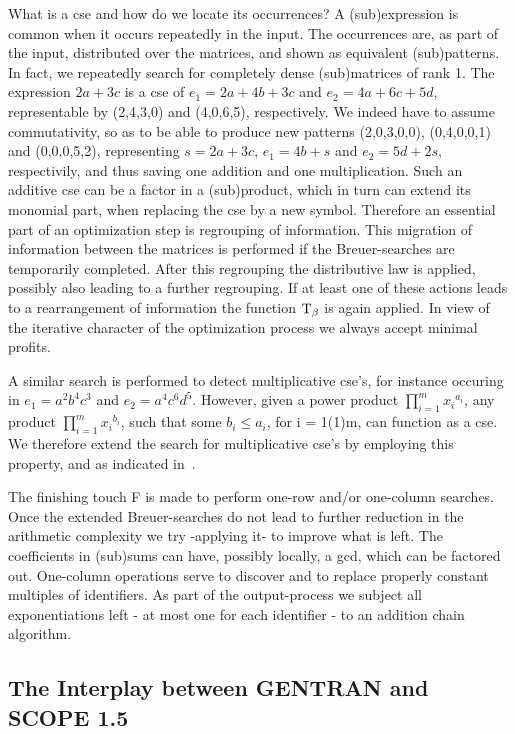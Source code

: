 What is a cse and how do we locate its occurrences?  A (sub)expression
is common when it occurs repeatedly in the input. The occurrences are,
as part of the input, distributed over the matrices, and shown as
equivalent (sub)patterns.  In fact, we repeatedly search for
completely dense (sub)matrices of rank 1.  The expression $2a + 3c$
is a cse of ${e_1}  = 2a + 4b + 3c$ and ${e_2} = 4a + 6c + 5d$,
representable by (2,4,3,0) and (4,0,6,5), respectively.  We
indeed have to assume commutativity, so as to be able to produce new
patterns (2,0,3,0,0), (0,4,0,0,1) and (0,0,0,5,2), representing $s = 2a + 3c$,
 ${e_1} = 4b + s$ and ${e_2} = 5d + 2s$,
respectivily, and thus saving one addition and one multiplication.
Such an additive cse can be a factor in a (sub)product,
which in turn can extend its monomial part, when replacing the cse
by a new symbol. Therefore an essential part of an
optimization step is regrouping of information. This migration of
information between the matrices is performed if the Breuer-searches
are temporarily completed.  After this regrouping the distributive law
is applied, possibly also leading to a further regrouping. If at
least one of these actions leads to a rearrangement of information the
function ${\rm T} _{\beta}$ is again applied.  In view of the
iterative character of the optimization process we always accept
minimal profits.

A similar search is performed to detect multiplicative cse's, for
instance occuring in ${e_1} = {a^2} {b^4} {c^3}$ and ${e_2} =
{a^4} {c^6} {d^5}$.  However, given a power product $\prod_{i=1}^m
{x_i}^{{a}_i}$, any product $\prod_{i=1}^m {x_i}^{{b}_i}$, such that
some ${b_i} \leq  {a_i}$, for i = 1(1)m, can function as a cse.  We
therefore extend the search for multiplicative cse's by employing this
property, and as indicated in~\cite{vanHulzen:83}.

The finishing touch F is made to perform one-row and/or
one-column searches. Once the extended Breuer-searches do not lead to
further reduction in the arithmetic complexity we try -applying it- to
improve what is left.  The coefficients in (sub)sums can have,
possibly locally, a gcd, which can be factored out.  One-column
operations serve to discover and to replace properly constant multiples of
identifiers.  As part of the output-process we subject all
exponentiations left - at most one for each identifier - to an
addition chain algorithm.

\subsection{The Interplay between GENTRAN and SCOPE 1.5}\label{SCOPE:inter}


